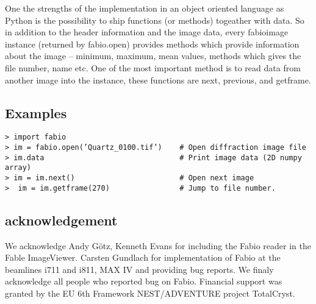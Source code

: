 \documentclass{iucr}
\begin{document}
One the strengths of the implementation in an object oriented language as Python
is the possibility to ship functions (or methods) togeather with data. So in
addition to the header information and the image data, every fabioimage instance
(returned by fabio.open) provides methods which provide information about the image – minimum, maximum, mean values, 
methods which gives the file number, name etc. One of the most important method
is to read data from another image into the instance, these functions are next, previous, and getframe.
   

\subsection{Examples}
\begin{verbatim}
> import fabio 							
> im = fabio.open(’Quartz_0100.tif’)	# Open diffraction image file
> im.data								# Print image data (2D numpy array)								  
> im = im.next()						# Open next image
>  im = im.getframe(270)				# Jump to file number.
\end{verbatim} 
\subsection{acknowledgement}
We acknowledge Andy G\"otz, Kenneth Evans for including the Fabio reader in the
Fable ImageViewer.  
Carsten Gundlach for implementation of Fabio at the beamlines i711 and i811, MAX IV and providing bug reports.
We finaly acknowledge all people who reported bug on Fabio. 
Financial support was granted by the EU 6th Framework NEST/ADVENTURE project
TotalCryst.



\end{document}
